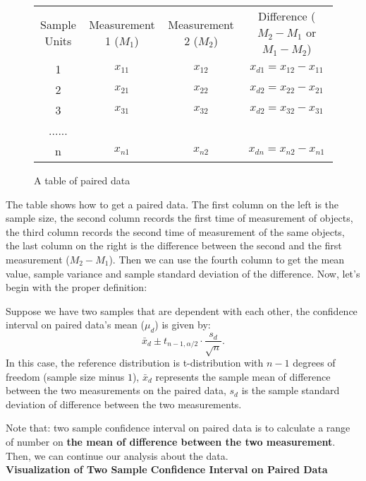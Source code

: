 \begin{center}
\begin{figure}[h!]
\centering
\begin{tabular}{ c c c c }
 Sample Units & Measurement 1 ($M_1$) & Measurement 2 ($M_2$) & Difference ($M_2 - M_1$ or $M_1 - M_2$)\\ 
 1 & $x_{11}$ & $x_{12}$ & $x_{d1} = x_{12} -  x_{11}$\\  
 2 & $x_{21}$ & $x_{22}$ & $x_{d2} = x_{22} -  x_{21}$\\
 3 & $x_{31}$ & $x_{32}$ & $x_{d2} = x_{32} -  x_{31}$\\
 ......\\
 n & $x_{n1}$ & $x_{n2}$ & $x_{dn} = x_{n2} -  x_{n1}$\\
\end{tabular}
\caption{A table of paired data}
\end{figure}
\end{center}

The table shows how to get a paired data. The first column on the left is the sample size, the second column records the first time of measurement of objects, the third column records the second time of measurement of the same objects, the last column on the right is the difference between the second and the first measurement ($M_2 - M_1$). Then we can use the fourth column to get the mean value, sample variance and sample standard deviation of the difference. Now, let's begin with the proper definition:

\begin{definition}
Suppose we have two samples that are dependent with each other, the confidence interval on paired data's mean ($\mu_d$) is given by: \[ \bar{x}_d  \pm t_{n-1, \alpha/2} \cdot \frac{s_d}{\sqrt{n}}.\]
In this case, the reference distribution is t-distribution with $n-1$ degrees of freedom (sample size minus $1$), $\bar{x}_d$ represents the sample mean of difference between the two measurements on the paired data, $s_d$ is the sample standard deviation of difference between the two measurements.
\end{definition}

Note that: two sample confidence interval on paired data is to calculate a range of number on \textbf{the mean of difference between the two measurement}. Then, we can continue our analysis about the data.\\

\textbf{Visualization of Two Sample Confidence Interval on Paired Data}

